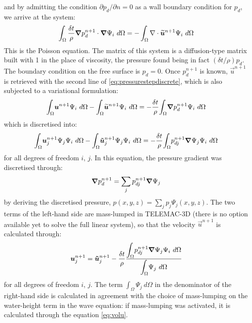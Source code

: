 and by admitting the condition $\partial p_{d}/\partial n=0$
as a wall boundary condition for $p_{d}$, we arrive at the system:%
\begin{equation}
\int_{\Omega}\dfrac{\delta t}{\rho}\bm{\nabla} p_{d}^{n+1}\cdot\bm{\nabla}\Psi_{i}~d\Omega =
-\int_{\Omega}\nabla \cdot\bm{\widetilde{u}}^{n+1}\Psi_{i}~d\Omega\label{lapla}
\end{equation}
This is the Poisson equation. The matrix of this system is a diffusion-type
matrix built with 1 in the place of viscosity, the pressure found being in
fact $(\delta t/\rho)p_{d}$. The boundary condition on the free surface
is $p_{d}=0$.
Once $p_{d}^{n+1}$ is known, $\vec{u}^{n+1}$ is retrieved with the second line of
\eqref{eq:pressurestepdiscrete}, which is also subjected to a variational formulation:%
\begin{equation}
\displaystyle{\int_{\Omega}}\vec{u}^{n+1}\Psi_i~d\Omega
-\displaystyle{\int_{\Omega}}\vec{\widetilde{u}}^{n+1}\Psi_i~d\Omega=
-\dfrac{\delta t}{\rho}\displaystyle{\int_{\Omega}}\Grad p_{d}^{n+1}\Psi_{i}~d\Omega
\label{projec2}%
\end{equation}
which is discretised into:
\begin{equation}
\displaystyle{\int_{\Omega}}\bm{u}_j^{n+1}\Psi_j\Psi_i~d\Omega
-\displaystyle{\int_{\Omega}}\bm{\tilde{u}}_j^{n+1}\Psi_j\Psi_i~d\Omega=
-\dfrac{\delta t}{\rho}\displaystyle{\int_{\Omega}}
p_{dj}^{n+1}\bm{\nabla}\Psi_{j}\Psi_i~d\Omega
\end{equation}
for all degrees of freedom $i$, $j$. In this equation, the pressure gradient
was discretised through:
\begin{equation}
\bm{\nabla} p_{d}^{n+1}=\sum_j p_{dj}^{n+1}\bm{\nabla}\Psi_{j}
\end{equation}
by deriving the discretised pressure, $p(x,y,z)=\sum_jp_j\Psi_j(x,y,z)$.
The two terms of the left-hand side are mass-lumped in TELEMAC-3D (there is no
option available yet to solve the full linear system), so that the velocity
$\vec{u}^{n+1}$ is calculated through:
\begin{equation}
\bm{u}_j^{n+1}=\bm{\tilde{u}}_j^{n+1}-\dfrac{\delta t}{\rho}
\dfrac{\displaystyle{\int_{\Omega}}p_{dj}^{n+1}\bm{\nabla}\Psi_{j}\Psi_i~d\Omega}
{\displaystyle{\int_{\Omega}}\Psi_{j}~d\Omega}
\end{equation}
for all degrees of freedom $i$, $j$. The term $\displaystyle{\int_{\Omega}}
\Psi_{j}~d\Omega$ in the denominator of the right-hand side is calculated in
agreement with the choice of mass-lumping on the water-height term in the
wave equation: if mass-lumping was activated, it is calculated through the
equation \eqref{eq:volu}.

